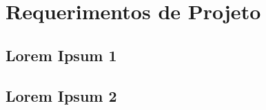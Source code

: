 \chapter{Requerimentos de Projeto}

\section{Lorem Ipsum 1}

\lipsum[1-4]

\section{Lorem Ipsum 2}

\lipsum[1-4]